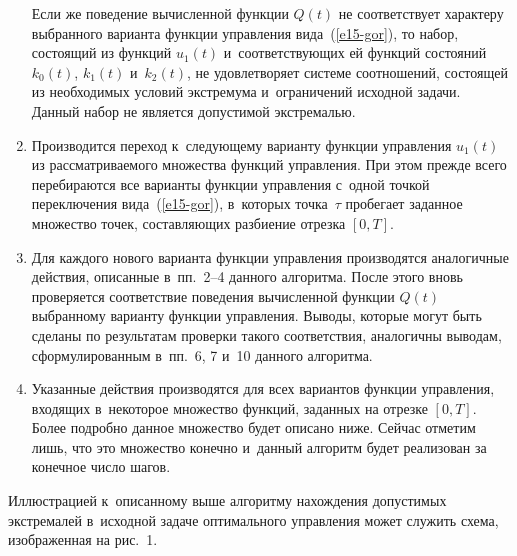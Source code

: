 \begin{multicols}{2}
\begin{enumerate}[1.]
Если же поведение вычисленной функции  $Q(t)$ не соответствует характеру выбранного 
варианта функции управления вида~(\ref{e15-gor}), то набор, состоящий из 
функций $u_{1}(t)$ и~соответству\-ющих ей функций состояний $k_{0}(t)$,
$k_{1}(t)$ и~$k_{2}(t)$, 
не удовле\-тво\-ря\-ет системе соотношений, состоящей из необходимых условий экстремума 
и~ограничений исходной задачи. Данный набор не является допустимой экстремалью.

\item Производится переход к~следующему варианту функции управления $u_{1}(t)$ из 
рассматриваемого множества функций управления. При этом прежде всего перебираются 
все варианты функции управления с~одной точкой переключения вида~(\ref{e15-gor}), 
в~которых точка~$\tau$ пробегает заданное множество точек, составляющих разбиение 
отрезка $[0,T]$.

\item Для каждого нового варианта функции управления производятся аналогичные 
действия, описанные в~пп.~2--4 данного алгоритма. После этого вновь проверяется 
соответствие поведения вычисленной функции $Q(t)$  выбранному варианту функции 
управления. Выводы, которые могут быть сделаны по результатам проверки такого 
соответствия, аналогичны выводам, сформулированным в~пп.~6, 7 и~10 данного алгоритма.

\item Указанные действия производятся для всех вариантов функции управления, входящих 
в~некоторое множество функций, заданных на отрезке $[0,T]$. Более подробно данное 
множество будет описано ниже. Сейчас отметим лишь, что это множество конечно 
и~данный алгоритм будет реализован за конечное число шагов.
\end{enumerate}

Иллюстрацией к~описанному выше алгоритму нахождения допустимых экстремалей 
в~исходной задаче оптимального управления может служить схема, изображенная на рис.~1.



\end{multicols}
